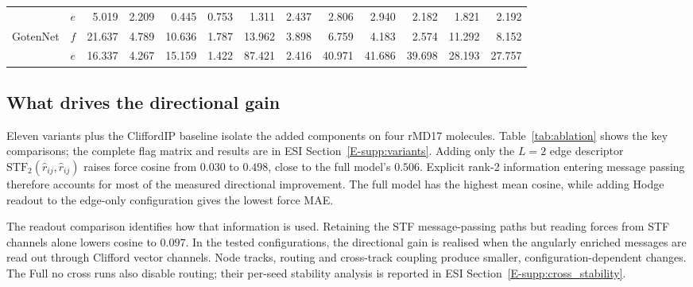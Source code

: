 \begin{table}[t]
\begin{tabular*}{\textwidth}{@{\extracolsep{\fill}}llrrrrrrrrrrr@{}}
 & $e$ & 5.019 & 2.209 & 0.445 & 0.753 & 1.311 & 2.437 & 2.806 & 2.940 & 2.182 & 1.821 & 2.192 \\
\addlinespace[1pt]
GotenNet & $f$ & 21.637 & 4.789 & 10.636 & 1.787 & 13.962 & 3.898 & 6.759 & 4.183 & 2.574 & 11.292 & 8.152 \\
 & $e$ & 16.337 & 4.267 & 15.159 & 1.422 & 87.421 & 2.416 & 40.971 & 41.686 & 39.698 & 28.193 & 27.757 \\
\bottomrule
\end{tabular*}
\end{table}

\subsection{What drives the directional gain}\label{sec:ablation}

Eleven variants plus the CliffordIP baseline isolate the added components on four rMD17 molecules. Table~\ref{tab:ablation} shows the key comparisons; the complete flag matrix and results are in ESI Section~\ref{E-supp:variants}. Adding only the $L{=}2$ edge descriptor $\mathrm{STF}_2(\hat r_{ij},\hat r_{ij})$ raises force cosine from $0.030$ to $0.498$, close to the full model's $0.506$. Explicit rank-2 information entering message passing therefore accounts for most of the measured directional improvement. The full model has the highest mean cosine, while adding Hodge readout to the edge-only configuration gives the lowest force MAE.

The readout comparison identifies how that information is used. Retaining the STF message-passing paths but reading forces from STF channels alone lowers cosine to $0.097$. In the tested configurations, the directional gain is realised when the angularly enriched messages are read out through Clifford vector channels. Node tracks, routing and cross-track coupling produce smaller, configuration-dependent changes. The Full no cross runs also disable routing; their per-seed stability analysis is reported in ESI Section~\ref{E-supp:cross_stability}.

